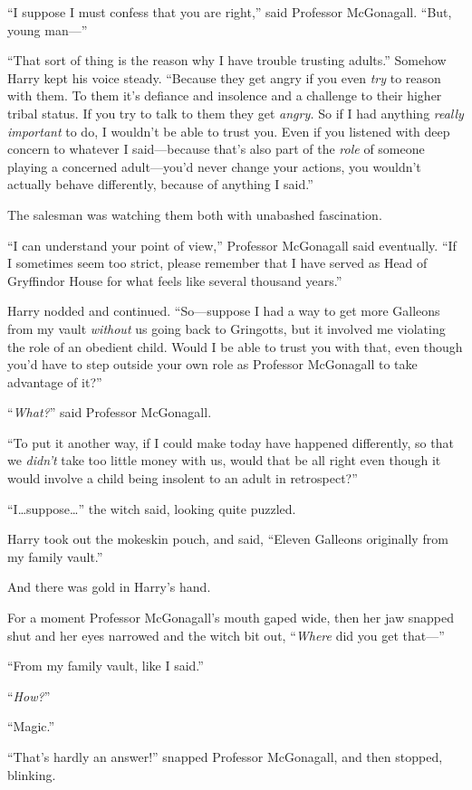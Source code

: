 “I suppose I must confess that you are right,” said Professor McGonagall. “But, young man—”

“That sort of thing is the reason why I have trouble trusting adults.” Somehow Harry kept his voice steady. “Because they get angry if you even \emph{try} to reason with them. To them it’s defiance and insolence and a challenge to their higher tribal status. If you try to talk to them they get \emph{angry.} So if I had anything \emph{really important} to do, I wouldn’t be able to trust you. Even if you listened with deep concern to whatever I said—because that’s also part of the \emph{role} of someone playing a concerned adult—you’d never change your actions, you wouldn’t actually behave differently, because of anything I said.”

The salesman was watching them both with unabashed fascination.

“I can understand your point of view,” Professor McGonagall said eventually. “If I sometimes seem too strict, please remember that I have served as Head of Gryffindor House for what feels like several thousand years.”

Harry nodded and continued. “So—suppose I had a way to get more Galleons from my vault \emph{without} us going back to Gringotts, but it involved me violating the role of an obedient child. Would I be able to trust you with that, even though you’d have to step outside your own role as Professor McGonagall to take advantage of it?”

“\emph{What?}” said Professor McGonagall.

“To put it another way, if I could make today have happened differently, so that we \emph{didn’t} take too little money with us, would that be all right even though it would involve a child being insolent to an adult in retrospect?”

“I…suppose…” the witch said, looking quite puzzled.

Harry took out the mokeskin pouch, and said, “Eleven Galleons originally from my family vault.”

And there was gold in Harry’s hand.

For a moment Professor McGonagall’s mouth gaped wide, then her jaw snapped shut and her eyes narrowed and the witch bit out, “\emph{Where} did you get that—”

“From my family vault, like I said.”

“\emph{How?}”

“Magic.”

“That’s hardly an answer!” snapped Professor McGonagall, and then stopped, blinking.

